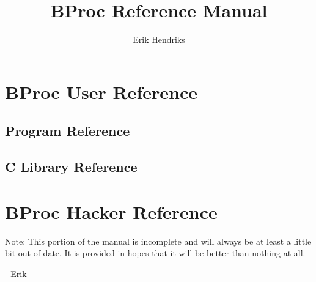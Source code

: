 \documentclass[oneside]{book}
\begin{document}
\title{BProc Reference Manual}
\author{Erik Hendriks}
\maketitle

\tableofcontents

\part{BProc User Reference}





\chapter{Program Reference}




\chapter{C Library Reference}




























\part{BProc Hacker Reference}

Note: This portion of the manual is incomplete and will always be at
least a little bit out of date.  It is provided in hopes that it will
be better than nothing at all.

\hfill - Erik




\printindex

%

\end{document}
